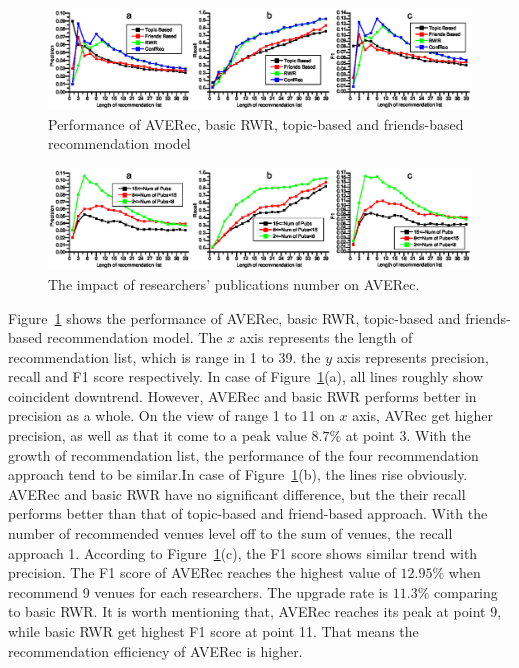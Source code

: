 \documentclass[9pt]{acm_proc_article-sp}
\begin{document}
\begin{figure}[t]
\centering
\includegraphics [width=\textwidth]{Fig4.eps}
\caption{Performance of AVERec, basic RWR, topic-based and friends-based recommendation model}
\label{fig4}
\end{figure}

\begin{figure}[t]
\centering
\includegraphics [width=\textwidth]{Fig5.eps}
\caption{The impact of researchers' publications number on AVERec.}
\label{fig5}
\end{figure}

Figure~\ref{fig4} shows the performance of AVERec, basic RWR, topic-based and friends-based recommendation model. The $x$ axis represents the length of recommendation list, which is range in 1 to 39. the $y$ axis represents precision, recall and F1 score respectively. In case of Figure~\ref{fig4}(a), all lines roughly show coincident downtrend. However, AVERec and basic RWR performs better in precision as a whole. On the view of range 1 to 11 on $x$ axis, AVRec get higher precision, as well as that it come to a peak value $8.7\%$ at point 3. With the growth of recommendation list, the performance of the four recommendation approach tend to be similar.In case of Figure~\ref{fig4}(b), the lines rise obviously. AVERec and basic RWR have no significant difference, but the their recall performs better than that of topic-based and friend-based approach. With the number of recommended venues level off to the sum of venues, the recall approach 1. According to Figure~\ref{fig4}(c), the F1 score shows similar trend with precision. The F1 score of AVERec reaches the highest value of $12.95\%$ when recommend 9 venues for each researchers. The upgrade rate is $11.3\%$ comparing to basic RWR. It is worth mentioning that, AVERec reaches its peak at point 9, while basic RWR get highest F1 score at point 11. That means the recommendation efficiency of AVERec is higher.
\end{document}
